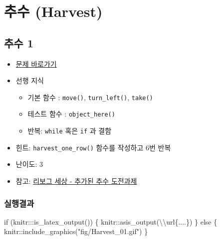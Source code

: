 \documentclass[
  b5paperpaper,
  DIV=11,
  numbers=noendperiod]{scrreprt}
\newenvironment{Shaded}{\begin{snugshade}}{\end{snugshade}}
\newcommand{\ControlFlowTok}[1]{\textcolor[rgb]{0.00,0.23,0.31}{#1}}
\newcommand{\FunctionTok}[1]{\textcolor[rgb]{0.28,0.35,0.67}{#1}}
\newcommand{\NormalTok}[1]{\textcolor[rgb]{0.00,0.23,0.31}{#1}}
\newcommand{\SpecialCharTok}[1]{\textcolor[rgb]{0.37,0.37,0.37}{#1}}
\newcommand{\StringTok}[1]{\textcolor[rgb]{0.13,0.47,0.30}{#1}}
\providecommand{\tightlist}{%
  \setlength{\itemsep}{0pt}\setlength{\parskip}{0pt}}\usepackage{longtable,booktabs,array}
\begin{document}
\hypertarget{harvest}{%
\chapter{추수 (Harvest)}\label{harvest}}

\hypertarget{harvest-01}{%
\section{추수 1}\label{harvest-01}}

\begin{itemize}
\tightlist
\item
  \href{https://reeborg.ca/reeborg.html?lang=ko-en\&mode=python\&menu=worlds\%2Fmenus\%2Freeborg_intro_en.json\&name=Harvest\%201\&url=worlds\%2Ftutorial_en\%2Fharvest1.json}{문제
  바로가기}
\item
  선행 지식

  \begin{itemize}
  \tightlist
  \item
    기본 함수 : \texttt{move()}, \texttt{turn\_left()}, \texttt{take()}
  \item
    테스트 함수 : \texttt{object\_here()}
  \item
    반복: \texttt{while} 혹은 \texttt{if} 과 결함
  \end{itemize}
\item
  힌트: \texttt{harvest\_one\_row()} 함수를 작성하고 6번 반복
\item
  난이도: 3
\item
  참고: \href{https://reeborg.ca/docs/ko/variables/harvest3.html}{리보그
  세상 - 추가된 추수 도전과제}
\end{itemize}

\hypertarget{uxc2e4uxd589uxacb0uxacfc-25}{%
\subsection{실행결과}\label{uxc2e4uxd589uxacb0uxacfc-25}}

\begin{Shaded}
\begin{Highlighting}[]
\ControlFlowTok{if}\NormalTok{ (knitr}\SpecialCharTok{:::}\FunctionTok{is\_latex\_output}\NormalTok{()) \{}
\NormalTok{  knitr}\SpecialCharTok{::}\FunctionTok{asis\_output}\NormalTok{(}\StringTok{\textquotesingle{}}\SpecialCharTok{\textbackslash{}\textbackslash{}}\StringTok{url\{....\}\textquotesingle{}}\NormalTok{)}
\NormalTok{\} }\ControlFlowTok{else}\NormalTok{ \{}
\NormalTok{  knitr}\SpecialCharTok{::}\FunctionTok{include\_graphics}\NormalTok{(}\StringTok{"fig/Harvest\_01.gif"}\NormalTok{)}
\NormalTok{\}}
\end{Highlighting}
\end{Shaded}
\end{document}
